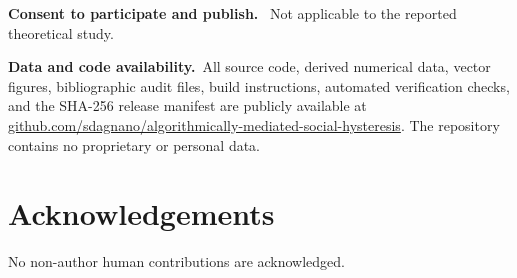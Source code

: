 \documentclass[10pt,a4paper]{article}
\newcommand{\inlinehead}[1]{\par\smallskip\noindent\textbf{#1}\ }
\begin{document}
\inlinehead{Consent to participate and publish.} Not applicable to the reported theoretical study.

\inlinehead{Data and code availability.}All source code, derived numerical data, vector figures, bibliographic audit files, build instructions, automated verification checks, and the SHA-256 release manifest are publicly available at \href{https://github.com/sdagnano/algorithmically-mediated-social-hysteresis}{github.com/sdagnano/algorithmically-mediated-social-hysteresis}. The repository contains no proprietary or personal data.

\section*{Acknowledgements} No non-author human contributions are acknowledged.
\end{document}
